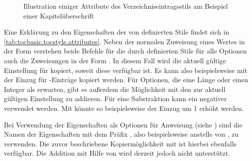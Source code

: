 \begin{description}
\begin{figure}
{%
    }
    \caption{Illustration einiger Attribute des Verzeichniseintragsstils
       am Beispiel einer Kapitelüberschrift}
    \label{fig:tocbasic.undottedtocline}
  \end{figure}
\end{description}
Eine Erklärung zu den Eigenschaften der von  definierten
Stile findet sich in \autoref{tab:tocbasic.tocstyle.attributes}.
Neben der normalen Zuweisung eines Wertes
in der Form  verstehen beide Befehle für
die durch \KOMAScript{} definierten Stile für alle Optionen auch die
Zuweisungen in der Form . In
diesem Fall wird die aktuell gültige Einstellung für 
kopiert, soweit diese verfügbar ist. Es kann also beispielsweise mit
 der Einzug für -Einträge kopiert
werden. Für Optionen, die eine Länge oder einen Integer als 
erwarten, gibt es außerdem die Möglichkeit mit
 den  zur aktuell gültigen
Einstellung zu addieren. Für eine Substraktion kann ein negativer 
verwendet werden. Mit  könnte so beispielsweise der
Einzug um 1 erhöht werden.

Bei Verwendung der Eigenschaften als
Optionen für Anweisung
 (siehe
) sind die Namen der Eigenschaften
mit dem Präfix , also beispielsweise 
anstelle von , zu verwenden. Die zuvor beschriebene
Kopiermöglichkeit mit \Option{:=} ist hierbei ebenfalls verfügbar. Die
Addition mit Hilfe von \Option{+=} wird derzeit jedoch nicht unterstützt.

